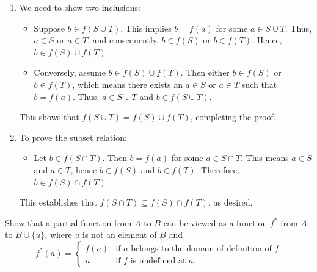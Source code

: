 		\begin{solution}
		\begin{enumerate}[label=(\alph*)]
			\item We need to show two inclusions:
			\begin{itemize}
				\item Suppose \( b \in f(S \cup T) \). This implies \( b = f(a) \) for some \( a \in S \cup T \). Thus, \( a \in S \) or \( a \in T \), and consequently, \( b \in f(S) \) or \( b \in f(T) \). Hence, \( b \in f(S) \cup f(T) \).
				
				\item Conversely, assume \( b \in f(S) \cup f(T) \). Then either \( b \in f(S) \) or \( b \in f(T) \), which means there exists an \( a \in S \) or \( a \in T \) such that \( b = f(a) \). Thus, \( a \in S \cup T \) and \( b \in f(S \cup T) \).
			\end{itemize}
			This shows that \( f(S \cup T) = f(S) \cup f(T) \), completing the proof.
		
			\item To prove the subset relation:
			\begin{itemize}
				\item Let \( b \in f(S \cap T) \). Then \( b = f(a) \) for some \( a \in S \cap T \). This means \( a \in S \) and \( a \in T \), hence \( b \in f(S) \) and \( b \in f(T) \). Therefore, \( b \in f(S) \cap f(T) \).
			\end{itemize}
			This establishes that \( f(S \cap T) \subseteq f(S) \cap f(T) \), as desired.
		\end{enumerate}
		\end{solution}

		\begin{exercise}
			Show that a partial function from \( A \) to \( B \) can be viewed as a function \( f^* \) from \( A \) to \( B \cup \{u\} \), where \( u \) is not an element of \( B \) and
			\[
			f^*(a) = 
			\begin{cases} 
			f(a) & \text{if } a \text{ belongs to the domain of definition of } f \\
			u & \text{if } f \text{ is undefined at } a.
			\end{cases}
			\]
			\end{exercise}
			
